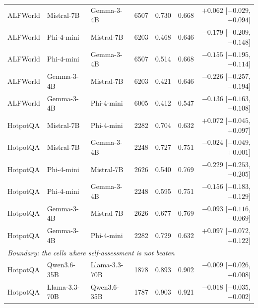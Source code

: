 \begin{table}[t]
\begin{tabular}{lllrrrr}
ALFWorld & Mistral-7B & Gemma-3-4B & 6507 & 0.730 & 0.668 & $+0.062$ [$+0.029$, $+0.094$] \\
ALFWorld & Phi-4-mini & Mistral-7B & 6203 & 0.468 & 0.646 & $-0.179$ [$-0.209$, $-0.148$] \\
ALFWorld & Phi-4-mini & Gemma-3-4B & 6507 & 0.514 & 0.668 & $-0.155$ [$-0.195$, $-0.114$] \\
ALFWorld & Gemma-3-4B & Mistral-7B & 6203 & 0.421 & 0.646 & $-0.226$ [$-0.257$, $-0.194$] \\
ALFWorld & Gemma-3-4B & Phi-4-mini & 6005 & 0.412 & 0.547 & $-0.136$ [$-0.163$, $-0.108$] \\
HotpotQA & Mistral-7B & Phi-4-mini & 2282 & 0.704 & 0.632 & $+0.072$ [$+0.045$, $+0.097$] \\
HotpotQA & Mistral-7B & Gemma-3-4B & 2248 & 0.727 & 0.751 & $-0.024$ [$-0.049$, $+0.001$] \\
HotpotQA & Phi-4-mini & Mistral-7B & 2626 & 0.540 & 0.769 & $-0.229$ [$-0.253$, $-0.205$] \\
HotpotQA & Phi-4-mini & Gemma-3-4B & 2248 & 0.595 & 0.751 & $-0.156$ [$-0.183$, $-0.129$] \\
HotpotQA & Gemma-3-4B & Mistral-7B & 2626 & 0.677 & 0.769 & $-0.093$ [$-0.116$, $-0.069$] \\
HotpotQA & Gemma-3-4B & Phi-4-mini & 2282 & 0.729 & 0.632 & $+0.097$ [$+0.072$, $+0.122$] \\
\midrule
\multicolumn{7}{l}{\emph{Boundary: the cells where self-assessment is not beaten}} \\
HotpotQA & Qwen3.6-35B & Llama-3.3-70B & 1878 & 0.893 & 0.902 & $-0.009$ [$-0.026$, $+0.008$] \\
HotpotQA & Llama-3.3-70B & Qwen3.6-35B & 1787 & 0.903 & 0.921 & $-0.018$ [$-0.035$, $-0.002$] \\
\bottomrule
\end{tabular}
\end{table}
